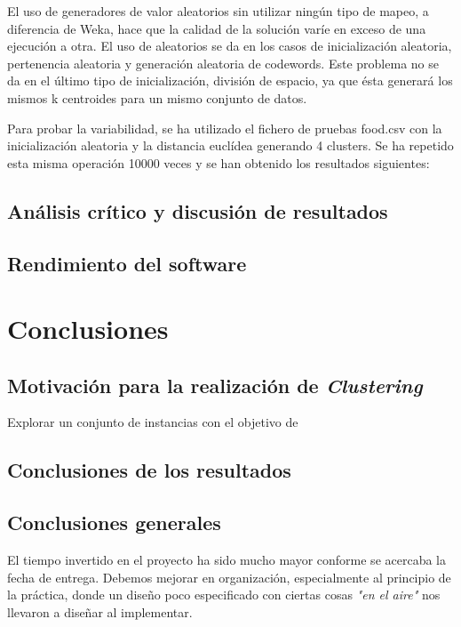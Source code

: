 \documentclass[a4paper]{report}
\begin{document}
	El uso de generadores de valor aleatorios sin utilizar ningún tipo de mapeo, a diferencia de Weka, hace que la calidad de la solución varíe en exceso de una ejecución a otra. El uso de aleatorios se da en los casos de inicialización aleatoria, pertenencia aleatoria y generación aleatoria de codewords. Este problema no se da en el último tipo de inicialización, división de espacio, ya que ésta generará los mismos k centroides para un mismo conjunto de datos.
	
	Para probar la variabilidad, se ha utilizado el fichero de pruebas food.csv con la inicialización aleatoria y la distancia euclídea generando 4 clusters. Se ha repetido esta misma operación 10000 veces y se han obtenido los resultados siguientes:
	
	\section{Análisis crítico y discusión de resultados}
	
	\section{Rendimiento del software}

\chapter{Conclusiones}

	\section{Motivación para la realización de \textit{Clustering}}
	
	Explorar un conjunto de instancias con el objetivo de 
	
	\section{Conclusiones de los resultados}
	
	\section{Conclusiones generales}
	
	El tiempo invertido en el proyecto ha sido mucho mayor conforme se acercaba la fecha de entrega. Debemos mejorar en organización, especialmente al principio de la práctica, donde un diseño poco especificado con ciertas cosas \textit{"en el aire"} nos llevaron a diseñar al implementar.
	
\end{document}
